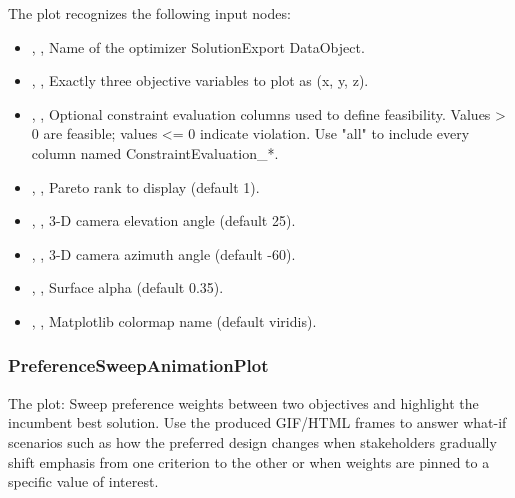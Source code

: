 The  plot recognizes the following input nodes:
\begin{itemize}
  \item {}, , Name of the optimizer SolutionExport DataObject.
  \item {}, , Exactly three objective variables to plot as (x, y, z).
  \item {}, , Optional constraint evaluation columns used to define feasibility. Values \textgreater{} 0 are feasible; values \textless{}= 0 indicate violation. Use "all" to include every column named ConstraintEvaluation\_*.
  \item {}, , Pareto rank to display (default 1).
  \item {}, , 3-D camera elevation angle (default 25).
  \item {}, , 3-D camera azimuth angle (default -60).
  \item {}, , Surface alpha (default 0.35).
  \item {}, , Matplotlib colormap name (default viridis).
\end{itemize}

\subsubsection{PreferenceSweepAnimationPlot}
The   plot: Sweep preference weights between two objectives and highlight the incumbent best solution. Use the produced GIF/HTML frames to answer what-if scenarios such as how the preferred design changes when stakeholders gradually shift emphasis from one criterion to the other or when weights are pinned to a specific value of interest.

